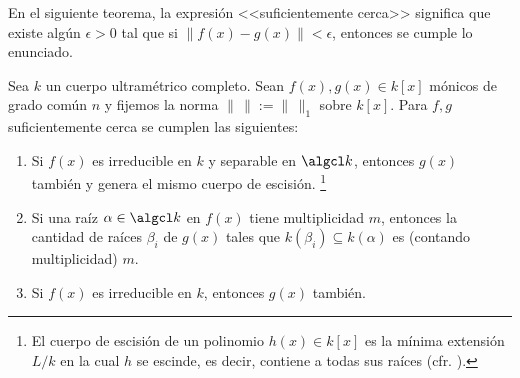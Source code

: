 \documentclass[teoria-numeros.tex]{subfiles}
\begin{document}
En el siguiente teorema, la expresión <<suficientemente cerca>> significa que existe algún $\epsilon > 0$ tal que si $\|f(x) - g(x)\| < \epsilon$,
entonces se cumple lo enunciado.
\begin{thm}
	Sea $k$ un cuerpo ultramétrico completo.
	Sean $f(x), g(x) \in k[x]$ mónicos de grado común $n$ y fijemos la norma $\|\,\| := \|\,\|_1$ sobre $k[x]$.
	Para $f, g$ suficientemente cerca se cumplen las siguientes:
	\begin{enumerate}
		\item Si $f(x)$ es irreducible en $k$ y separable en $\algcl k$, entonces $g(x)$ también y genera el mismo cuerpo de escisión.%
			\footnote{El cuerpo de escisión de un polinomio $h(x) \in k[x]$ es la mínima extensión $L/k$ en la cual $h$ se escinde,
			es decir, contiene a todas sus raíces (cfr. \cite[def.~4.19]{Alg}).}
		\item Si una raíz $\alpha \in \algcl k$ en $f(x)$ tiene multiplicidad $m$, entonces la cantidad de raíces $\beta_i$ de $g(x)$
			tales que $k(\beta_i) \subseteq k(\alpha)$ es (contando multiplicidad) $m$.
		\item Si $f(x)$ es irreducible en $k$, entonces $g(x)$ también.
	\end{enumerate}
\end{thm}
\end{document}
